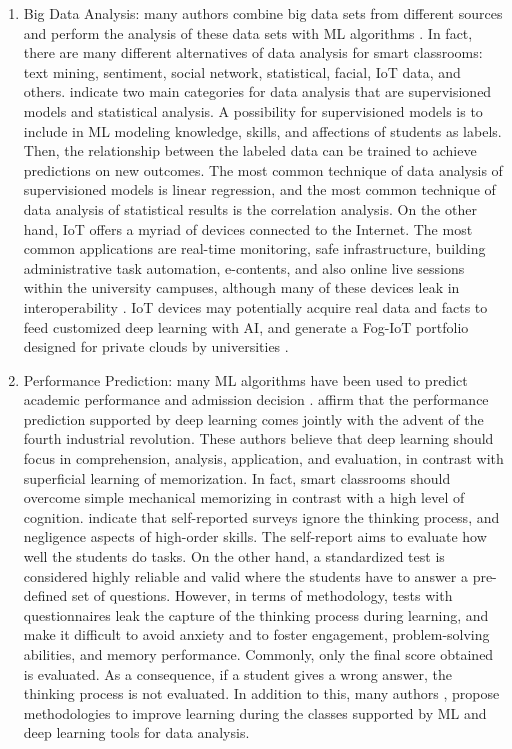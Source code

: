 \documentclass[english]{textolivre}
\begin{document}
\begin{enumerate}
  \item Big Data Analysis: many authors combine big data sets from
  different sources and perform the analysis of these data sets with ML
  algorithms \cite{Bhatnagar2023,Chai2024,Bansal2023,Madhani2022,Li2023}. In
  fact, there are many different alternatives of data analysis for smart
  classrooms: text mining, sentiment, social network, statistical,
  facial, IoT data, and others. \textcite{Zhu2023} indicate two
  main categories for data analysis that are supervisioned models and
  statistical analysis. A possibility for supervisioned models is to
  include in ML modeling knowledge, skills, and affections of students
  as labels. Then, the relationship between the labeled data can be
  trained to achieve predictions on new outcomes. The most common
  technique of data analysis of supervisioned models is linear
  regression, and the most common technique of data analysis of
  statistical results is the correlation analysis. On the other hand,
  IoT offers a myriad of devices connected to the Internet. The most
  common applications are real-time monitoring, safe infrastructure,
  building administrative task automation, e-contents, and also online
  live sessions within the university campuses, although many of these
  devices leak in interoperability \cite{Bhatnagar2023}. IoT devices
  may potentially acquire real data and facts to feed customized deep
  learning with AI, and generate a Fog-IoT portfolio designed for
  private clouds by universities \cite{Bhatnagar2023}.

  \item Performance Prediction: many ML algorithms have been used to
  predict academic performance and admission decision \cite{Zhu2023}.
  \textcite{He2022} affirm that the performance prediction supported by
  deep learning comes jointly with the advent of the fourth industrial
  revolution. These authors believe that deep learning should focus in
  comprehension, analysis, application, and evaluation, in contrast with
  superficial learning of memorization. In fact, smart classrooms should
  overcome simple mechanical memorizing in contrast with a high level of
  cognition. \textcite{Zhu2023} indicate that self-reported
  surveys ignore the thinking process, and negligence aspects of
  high-order skills. The self-report aims to evaluate how well the
  students do tasks. On the other hand, a standardized test is
  considered highly reliable and valid where the students have to answer
  a pre-defined set of questions. However, in terms of methodology,
  tests with questionnaires leak the capture of the thinking process
  during learning, and make it difficult to avoid anxiety and to foster
  engagement, problem-solving abilities, and memory performance.
  Commonly, only the final score obtained is evaluated. As a
  consequence, if a student gives a wrong answer, the thinking process
  is not evaluated. In addition to this, many authors \cite{He2022},
  \textcite{Luan2021,Zhang2021,Zhang2022,Wu2021} propose methodologies to improve learning during the
  classes supported by ML and deep learning tools for data analysis.


\end{enumerate}
\end{document}
